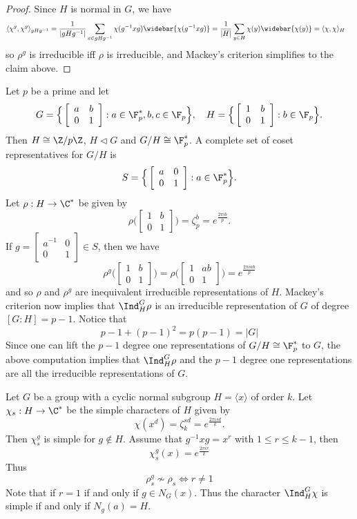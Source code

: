 \begin{proof}
Since $H$ is normal in $G$, we have
\begin{align*}
\langle\chi^g,\chi^g\rangle_{gHg^{-1}}&=\frac{1}{|gHg^{-1}|}\sum_{x\in gHg^{-1}}\chi(g^{-1}xg)\widebar{\chi(g^{-1}xg)}=\frac{1}{|H|}\sum_{y\in H}\chi(y)\widebar{\chi(y)}=\langle\chi,\chi\rangle_H
\end{align*}
so $\rho^g$ is irreducible iff $\rho$ is irreducible, and Mackey's criterion simplifies to the claim above.
\end{proof}
\begin{example}
Let $p$ be a prime and let
\[G=\Big\{\left[\begin{array}{cc}
a&b\\
0&1
\end{array}\right]:a\in\F_p^*,b,c\in\F_p\Big\},\quad H=\Big\{\left[\begin{array}{cc}
1&b\\
0&1
\end{array}\right]:b\in\F_p\Big\}.\]
Then $H\cong\Z/p\Z$, $H\lhd G$ and $G/H\cong\F_p^*$. A complete set of coset representatives for $G/H$ is
\[S=\Big\{\left[\begin{array}{cc}
a&0\\
0&1
\end{array}\right]:a\in\F_p^*\Big\}.\]
Let $\rho:H\to\C^*$ be given by
\[\rho\Big(\left[\begin{array}{cc}
1&b\\
0&1
\end{array}\right]\Big)=\zeta_p^b=e^{\frac{2\pi ib}{p}}.\]
If $g=\begin{bmatrix}
a^{-1}&0\\
0&1
\end{bmatrix}\in S$, then we have
\[\rho^g\Big(\left[\begin{array}{cc}
1&b\\
0&1
\end{array}\right]\Big)=\rho\Big(\left[\begin{array}{cc}
1&ab\\
0&1
\end{array}\right]\Big)=e^{\frac{2\pi iab}{p}}\]
and so $\rho$ and $\rho^g$ are inequivalent irreducible representations of $H$. Mackey's criterion now implies that $\Ind^G_H\rho$ is an irreducible representation of $G$ of degree $[G:H]=p-1$. Notice that
\[p-1+(p-1)^2=p(p-1)=|G|\]
Since one can lift the $p-1$ degree one representations of $G/H\cong\F_p^*$ to $G$, the above computation implies that $\Ind^G_H\rho$ and the $p-1$ degree one representations are all the irreducible representations of $G$.
\end{example}
\begin{example}\label{representation induced by cyclic normal subgroup}
Let $G$ be a group with a cyclic normal subgroup $H=\langle x\rangle$ of order $k$. Let $\chi_s:H\to\C^*$ be the simple characters of $H$ given by
\[\chi(x^d)=\zeta_k^{sd}=e^{\frac{2\pi isd}{k}}.\]
Then $\chi_s^g$ is simple for $g\notin H$. Assume that $g^{-1}xg=x^r$ with $1\leq r\leq k-1$, then 
\[\chi_s^g(x)=e^{\frac{2\pi ir}{k}}\]
Thus
\[\rho_s^g\nsim\rho_s\iff r\neq 1\]
Note that if $r=1$ if and only if $g\in N_G(x)$. Thus the character $\Ind^G_H\chi$ is simple if and only if $N_g(a)=H$.
\end{example}
